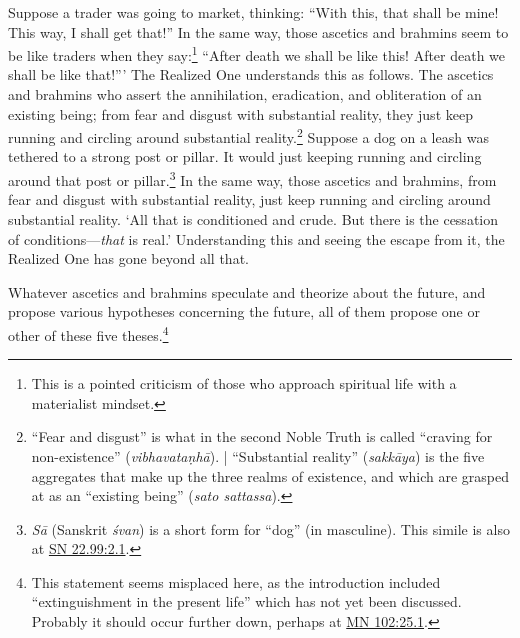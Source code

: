 \documentclass[12pt,openany]{book}%
\begin{document}
Suppose a trader was going to market, thinking: “With this, that shall be mine! This way, I shall get that!” In the same way, those ascetics and brahmins seem to be like traders when they say:\footnote{This is a pointed criticism of those who approach spiritual life with a materialist mindset. } “After death we shall be like this! After death we shall be like that!”’ The Realized One understands this as follows. The ascetics and brahmins who assert the annihilation, eradication, and obliteration of an existing being; from fear and disgust with substantial reality, they just keep running and circling around substantial reality.\footnote{“Fear and disgust” is what in the second Noble Truth is called “craving for non-existence” (\textit{\textsanskrit{vibhavataṇhā}}). | “Substantial reality” (\textit{\textsanskrit{sakkāya}}) is the five aggregates that make up the three realms of existence, and which are grasped at as an “existing being” (\textit{sato sattassa}). } Suppose a dog on a leash was tethered to a strong post or pillar. It would just keeping running and circling around that post or pillar.\footnote{\textit{\textsanskrit{Sā}} (Sanskrit \textit{\textsanskrit{śvan}}) is a short form for “dog” (in masculine). This simile is also at \href{https://suttacentral.net/sn22.99/en/sujato\#2.1}{SN 22.99:2.1}. } In the same way, those ascetics and brahmins, from fear and disgust with substantial reality, just keep running and circling around substantial reality. ‘All that is conditioned and crude. But there is the cessation of conditions—\emph{that} is real.’ Understanding this and seeing the escape from it, the Realized One has gone beyond all that. 

Whatever ascetics and brahmins speculate and theorize about the future, and propose various hypotheses concerning the future, all of them propose one or other of these five theses.\footnote{This statement seems misplaced here, as the introduction included “extinguishment in the present life” which has not yet been discussed. Probably it should occur further down, perhaps at \href{https://suttacentral.net/mn102/en/sujato\#25.1}{MN 102:25.1}. } 
\end{document}
